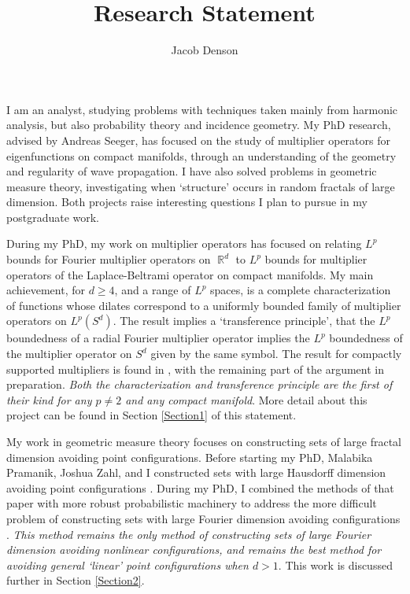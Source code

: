 \documentclass[11pt]{article}
\title{\vspace{-2em}Research Statement}
\author{Jacob Denson}
\date{}
\DeclareMathOperator{\RR}{\mathbb{R}}
\begin{document}
\maketitle

I am an analyst, studying problems with techniques taken mainly from harmonic analysis, but also probability theory and incidence geometry. My PhD research, advised by Andreas Seeger, has focused on the study of multiplier operators for eigenfunctions on compact manifolds, through an understanding of the geometry and regularity of wave propagation. I have also solved problems in geometric measure theory, investigating when `structure' occurs in random fractals of large dimension. Both projects raise interesting questions I plan to pursue in my postgraduate work.

During my PhD, my work on multiplier operators has focused on relating $L^p$ bounds for Fourier multiplier operators on $\RR^d$ to $L^p$ bounds for multiplier operators of the Laplace-Beltrami operator on compact manifolds. My main achievement, for $d \geq 4$, and a range of $L^p$ spaces, is a complete characterization of functions whose dilates correspond to a uniformly bounded family of multiplier operators on $L^p(S^d)$. The result implies a `transference principle', that the $L^p$ boundedness of a radial Fourier multiplier operator implies the $L^p$ boundedness of the multiplier operator on $S^d$ given by the same symbol. %
The result for compactly supported multipliers is found in \cite{DensonCharacterization}, with the remaining part of the argument in preparation. \emph{Both the characterization and transference principle are the first of their kind for any $p \neq 2$ and any compact manifold}. More detail about this project can be found in Section \ref{Section1} of this statement.

%
%
%
%

My work in geometric measure theory focuses on constructing sets of large fractal dimension avoiding point configurations. Before starting my PhD, Malabika Pramanik, Joshua Zahl, and I constructed sets with large Hausdorff dimension avoiding point configurations \cite{DensonPramanikZahl,DensonThesis}. During my PhD, I combined the methods of that paper with more robust probabilistic machinery to address the more difficult problem of constructing sets with large Fourier dimension avoiding configurations \cite{DensonFourier}. \emph{This method remains the only method of constructing sets of large Fourier dimension avoiding nonlinear configurations, and remains the best method for avoiding general `linear' point configurations when $d > 1$}. This work is discussed further in Section \ref{Section2}.
\end{document}
